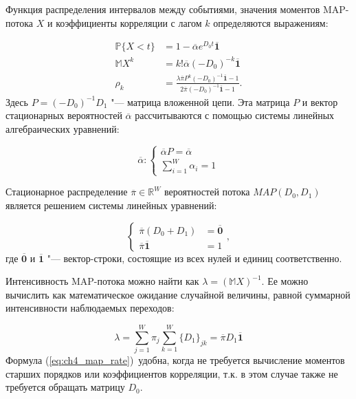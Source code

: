 Функция распределения интервалов между событиями, значения моментов MAP-потока $X$ и коэффициенты корреляции с лагом $k$ определяются выражениям:

\begin{equation}
	\label{eq:ch4_map_props}
    \begin{aligned}
    \mathbb{P}\{X < t\} &= 1 - \overline{\alpha}e^{D_0 t}\overline{\mathbf{1}}\\
    \mathbb{M}X^{k} &= k! \overline{\alpha}(-D_0)^{-k}\overline{\mathbf{1}}\\
    \rho_k &= \frac{\lambda \overline{\pi} P^k (-D_0)^{-1} \overline{\mathbf{1}} - 1}{2 \overline{\pi} (-D_0)^{-1} \overline{\mathbf{1}} - 1}.
    \end{aligned}
\end{equation}
Здесь $P = (-D_0)^{-1} D_1$ "--- матрица вложенной цепи. Эта матрица $P$ и вектор стационарных вероятностей $\overline{\alpha}$ рассчитываются с помощью системы линейных алгебраических уравнений:

\begin{equation}
\label{eq:ch4_map_dtmc}
	\overline{\alpha}: \begin{cases}
		\overline{\alpha} P = \overline{\alpha} \\
		\sum\limits_{i=1}^{W} \alpha_i = 1
 	\end{cases}
\end{equation}

Стационарное распределение $\overline{\pi} \in \mathbb{R}^W$ вероятностей потока $MAP(D_0, D_1)$ является решением системы линейных уравнений:

\begin{equation}
	\label{eq:ch4_map_pmf}
	\begin{cases}
		\overline{\pi}(D_0 + D_1) &= \overline{\mathbf{0}}\\
		\overline{\pi}\overline{\mathbf{1}} &= 1
	\end{cases},
\end{equation}
где $\overline{\mathbf{0}}$ и $\overline{\mathbf{1}}$ "--- вектор-строки, состоящие из всех нулей и единиц соответственно.

Интенсивность MAP-потока можно найти как $\lambda = (\mathbb{M}X)^{-1}$. Ее можно вычислить как математическое ожидание случайной величины, равной суммарной интенсивности наблюдаемых переходов:

\begin{equation}
	\label{eq:ch4_map_rate}
	\lambda = \sum\limits_{j=1}^{W} \pi_j \sum\limits_{k=1}^{W} \{D_1\}_{jk} = \overline{\pi} D_1 \overline{\mathbf{1}}
\end{equation}
Формула (\ref{eq:ch4_map_rate})~удобна, когда не требуется вычисление моментов старших порядков или коэффициентов корреляции, т.к. в этом случае также не требуется обращать матрицу $D_0$.

